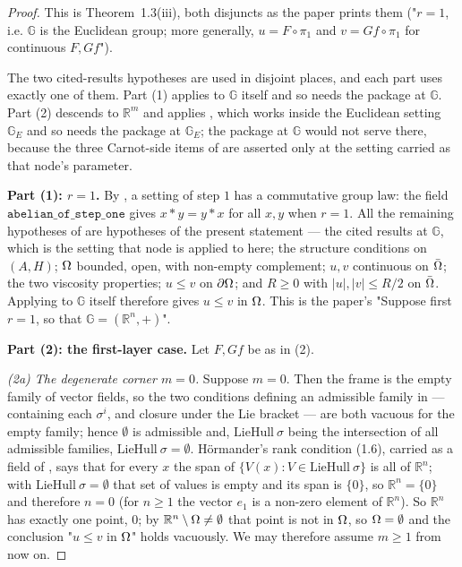 \begin{proof}
This is Theorem~1.3(iii), both disjuncts as the paper prints them ("$r=1$, i.e. $\mathbb G$ is
the Euclidean group; more generally, $u=F\circ\pi_1$ and $v=Gf\circ\pi_1$ for continuous
$F,Gf$").

The two cited-results hypotheses are used in disjoint places, and each part uses exactly one
of them. Part (1) applies  to $\mathbb G$ itself and so needs the
package at $\mathbb G$. Part (2) descends to $\mathbb R^{m}$ and applies
, which works inside the Euclidean setting $\mathbb G_E$
and so needs the package at $\mathbb G_E$; the package at $\mathbb G$ would not serve there,
because the three Carnot-side items of  are asserted only at the
setting carried as that node's parameter.

\medskip\noindent\textbf{Part (1): $r=1$.} By , a setting of step $1$
has a commutative group law: the field $\mathtt{abelian\_of\_step\_one}$ gives
$x*y=y*x$ for all $x,y$ when $r=1$. All the remaining hypotheses of
 are hypotheses of the present statement --- the cited results at
$\mathbb G$, which is the setting that node is applied to here;
the structure conditions on $(A,H)$; $\Omega$ bounded, open, with non-empty complement; $u,v$
continuous on $\bar{\Omega}$; the two viscosity properties; $u\le v$ on $\partial\Omega$; and $R\ge0$
with $|u|,|v|\le R/2$ on $\bar{\Omega}$. Applying  to
$\mathbb G$ itself therefore gives $u\le v$ in $\Omega$. This is the paper's "Suppose first
$r=1$, so that $\mathbb G=(\mathbb R^{n},+)$".

\medskip\noindent\textbf{Part (2): the first-layer case.} Let $F,Gf$ be as in (2).

\emph{(2a) The degenerate corner $m=0$.} Suppose $m=0$. Then the frame is the empty family
of vector fields, so the two conditions defining an admissible family in 
--- containing each $\sigma^{i}$, and closure under the Lie bracket --- are both vacuous for
the empty family; hence $\emptyset$ is admissible and, $\mathrm{LieHull}\ \sigma$ being the
intersection of all admissible families, $\mathrm{LieHull}\ \sigma=\emptyset$. Hörmander's
rank condition (1.6), carried as a field of , says that for
every $x$ the span of $\{V(x):V\in\mathrm{LieHull}\ \sigma\}$ is all of $\mathbb R^{n}$; with
$\mathrm{LieHull}\ \sigma=\emptyset$ that set of values is empty and its span is $\{0\}$, so
$\mathbb R^{n}=\{0\}$ and therefore $n=0$ (for $n\ge1$ the vector $e_1$ is a non-zero element
of $\mathbb R^{n}$). So $\mathbb R^{n}$ has exactly one point, $0$; by
$\mathbb R^{n}\setminus\Omega\ne\emptyset$ that point is not in $\Omega$, so $\Omega=\emptyset$ and the
conclusion "$u\le v$ in $\Omega$" holds vacuously. We may therefore assume $m\ge1$ from now on.


\end{proof}

